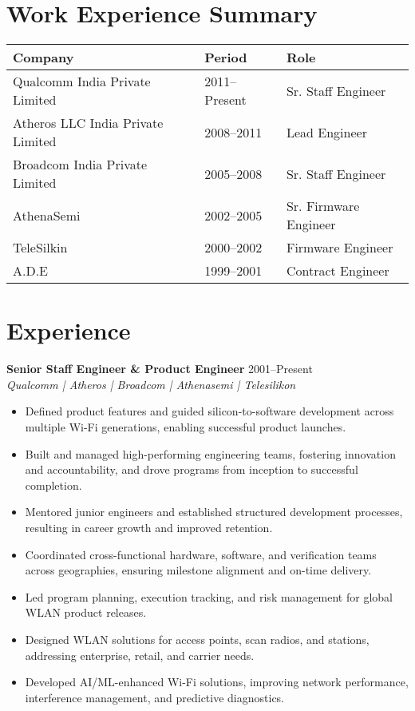 \documentclass[a4paper,11pt]{article}
\begin{document}
\section*{Work Experience Summary}
\begin{flushleft}
\renewcommand{\arraystretch}{1.3}
\begin{tabularx}{\textwidth}{@{} l l X @{}}
\textbf{Company} & \textbf{Period} & \textbf{Role} \\
\hline
Qualcomm India Private Limited & 2011--Present & Sr. Staff Engineer \\
Atheros LLC India Private Limited & 2008--2011 & Lead Engineer \\
Broadcom India Private Limited & 2005--2008 & Sr. Staff Engineer \\
AthenaSemi & 2002--2005 & Sr. Firmware Engineer \\
TeleSilkin & 2000--2002 & Firmware Engineer \\
A.D.E & 1999--2001 & Contract Engineer \\
\end{tabularx}
\end{flushleft}


\section*{Experience}
\textbf{Senior Staff Engineer \& Product Engineer} \hfill 2001--Present \\
\textit{Qualcomm | Atheros | Broadcom | Athenasemi | Telesilikon} \\
\begin{itemize}
    \item Defined product features and guided silicon-to-software development across multiple Wi-Fi generations, enabling successful product launches.
    \item Built and managed high-performing engineering teams, fostering innovation and accountability, and drove programs from inception to successful completion.
    \item Mentored junior engineers and established structured development processes, resulting in career growth and improved retention.
    \item Coordinated cross-functional hardware, software, and verification teams across geographies, ensuring milestone alignment and on-time delivery.
    \item Led program planning, execution tracking, and risk management for global WLAN product releases.
    \item Designed WLAN solutions for access points, scan radios, and stations, addressing enterprise, retail, and carrier needs.
    \item Developed AI/ML-enhanced Wi-Fi solutions, improving network performance, interference management, and predictive diagnostics.
\end{itemize}
\end{document}
